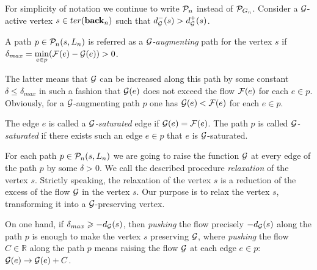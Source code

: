 \documentclass[12pt,oneside,a4paper]{amsart}
\begin{document}
        For simplicity of notation we continue to write $\gnpaths$ instead of $\cal{P}_{G_n}$.
        Consider a $\cal{G}$-active vertex $s \in \ter(\eback_n)$ such that $d_{\cal{G}}^{-}(s) > d_{\cal{G}}^{+}(s)$.
        \begin{definition}
          A path $p \in \gnpaths(s, L_n)$ is referred as a \emph{$\cal{G}$-augmenting} path for the vertex $s$
            if $\delta_{max}=\min\limits_{e \in p}(\flowpos(e) - \cal{G}(e)) > 0$.
        \end{definition}
        The latter means that $\cal{G}$ can be increased along this path by some constant $\delta \leq \delta_{max}$
          in such a fashion that $\cal{G}(e)$ does not exceed the flow $\flowpos(e)$ for each $e \in p$.
        Obviously, for a $\cal{G}$-augmenting path $p$ one has $\cal{G}(e) < \flowpos(e)$ for each $e \in p$.
        \begin{definition}
          The edge $e$ is called a \emph{$\cal{G}$-saturated} edge if $\cal{G}(e) = \flowpos(e)$.
          The path $p$ is called \emph{$\cal{G}$-saturated} if there exists such an edge $e \in p$ that $e$ is $\cal{G}$-saturated.
        \end{definition}
        For each path $p \in \gnpaths(s, L_n)$ we are going to raise the function $\cal{G}$ at every edge of the path $p$
        by some $\delta > 0$.
        We call the described procedure \emph{relaxation} of the vertex $s$.
        Strictly speaking, the {relaxation}
          of the vertex $s$ is a reduction of the excess of the flow $\cal{G}$ in the vertex $s$.
        Our purpose is to relax the vertex $s$, transforming it into a $\cal{G}$-preserving vertex.

        On one hand, if $\delta_{max} \geq -d_{\cal{G}}(s)$, then \emph{pushing} the flow precisely $-d_{\cal{G}}(s)$ along the path $p$
          is enough to make the vertex $s$ preserving $\cal{G}$, where
          \emph{pushing} the flow $C \in \mathbb{R}$ along the path $p$ means raising the flow $\cal{G}$ at each edge $e \in p$:
          $\cal{G}(e) \to \cal{G}(e) + C$.
\end{document}
